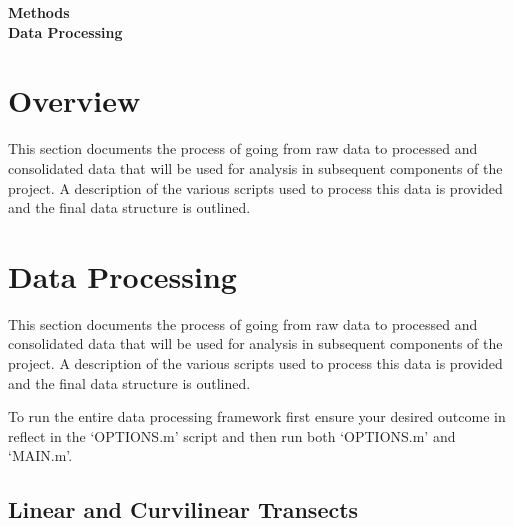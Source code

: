 \documentclass[12pt]{article}
\begin{document}

\begin{center}
\Large \textbf{Methods\\ Data Processing}
\end{center}


\section*{Overview}
This section documents the process of going from raw data to processed and consolidated data that will be used for analysis in subsequent components of the project. A description of the various scripts used to process this data is provided and the final data structure is outlined.


\tableofcontents
\pagebreak


\section{Data Processing}
This section documents the process of going from raw data to processed and consolidated data that will be used for analysis in subsequent components of the project. A description of the various scripts used to process this data is provided and the final data structure is outlined.

To run the entire data processing framework first ensure your desired outcome in reflect in the `OPTIONS.m' script and then run both `OPTIONS.m' and `MAIN.m'.


\subsection{Linear and Curvilinear Transects}
\end{document}
